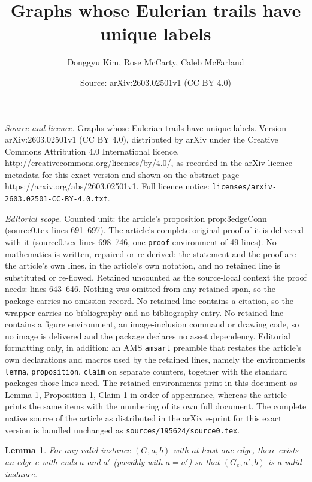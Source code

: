\documentclass[10pt,a4paper]{amsart}
\title{Graphs whose Eulerian trails have unique labels}
\author{Donggyu Kim, Rose McCarty, Caleb McFarland}
\date{Source: arXiv:2603.02501v1 (CC BY 4.0)}
\newtheorem{lemma}{Lemma}
\begin{document}
\maketitle

\noindent\emph{Source and licence.} Graphs whose Eulerian trails have unique labels. Version arXiv:2603.02501v1 (CC BY 4.0), distributed by arXiv under the Creative Commons Attribution 4.0 International licence, http://creativecommons.org/licenses/by/4.0/, as recorded in the arXiv licence metadata for this exact version and shown on the abstract page https://arxiv.org/abs/2603.02501v1. Full licence notice: \texttt{licenses/arxiv-2603.02501-CC-BY-4.0.txt}.\par\smallskip

\noindent\textit{Editorial scope.} Counted unit: the article's proposition prop:3edgeConn (source0.tex lines 691--697). The article's complete original proof of it is delivered with it (source0.tex lines 698--746, one \texttt{proof} environment of 49 lines). No mathematics is written, repaired or re-derived: the statement and the proof are the article's own lines, in the article's own notation, and no retained line is substituted or re-flowed.  Retained uncounted as the source-local context the proof needs: lines 643--646.  Nothing was omitted from any retained span, so the package carries no omission record.  No retained line contains a citation, so the wrapper carries no bibliography and no bibliography entry.  No retained line contains a figure environment, an image-inclusion command or drawing code, so no image is delivered and the package declares no asset dependency.  Editorial formatting only, in addition: an AMS \texttt{amsart} preamble that restates the article's own declarations and macros used by the retained lines, namely the environments \texttt{lemma}, \texttt{proposition}, \texttt{claim} on separate counters, together with the standard packages those lines need.  The retained environments print in this document as Lemma 1, Proposition 1, Claim 1 in order of appearance, whereas the article prints the same items with the numbering of its own full document.  The complete native source of the article as distributed in the arXiv e-print for this exact version is bundled unchanged as \texttt{sources/195624/source0.tex}.
\begin{lemma}
\label{lem:splittingMinCut}
For any valid instance $(G, a, b)$ with at least one edge, there exists an edge $e$ with ends $a$ and $a'$ (possibly with $a=a'$) so that $(G_e, a', b)$ is a valid instance.
\end{lemma}
\end{document}
